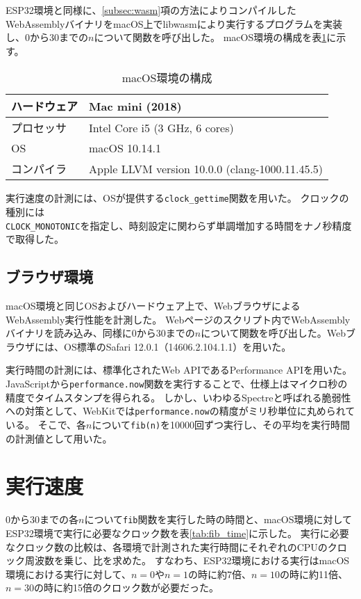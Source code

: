 ESP32環境と同様に、\ref{subsec:wasm}項の方法によりコンパイルしたWebAssemblyバイナリをmacOS上でlibwasmにより実行するプログラムを実装し、0から30までの$n$について関数を呼び出した。
macOS環境の構成を表\ref{tab:mac_spec}に示す。

\begin{table}[htbp]
  \label{tab:mac_spec}
  \caption{macOS環境の構成}
  \begin{center}
    \begin{tabular}{|l|l|}
    \hline
    ハードウェア & Mac mini (2018) \\ \hline
    プロセッサ & Intel Core i5 (3 GHz, 6 cores) \\ \hline
    OS & macOS 10.14.1 \\ \hline
    コンパイラ & Apple LLVM version 10.0.0 (clang-1000.11.45.5) \\ \hline
    \end{tabular}
  \end{center}
\end{table}

実行速度の計測には、OSが提供する\verb|clock_gettime|関数を用いた。
クロックの種別には \\
\verb|CLOCK_MONOTONIC|を指定し、時刻設定に関わらず単調増加する時間をナノ秒精度で取得した。

\subsection{ブラウザ環境}

macOS環境と同じOSおよびハードウェア上で、WebブラウザによるWebAssembly実行性能を計測した。
Webページのスクリプト内でWebAssemblyバイナリを読み込み、同様に0から30までの$n$について関数を呼び出した。Webブラウザには、OS標準のSafari 12.0.1（14606.2.104.1.1）を用いた。

実行時間の計測には、標準化されたWeb APIであるPerformance APIを用いた。
JavaScriptから\verb|performance.now|関数を実行することで、仕様上はマイクロ秒の精度でタイムスタンプを得られる。
しかし、いわゆるSpectreと呼ばれる脆弱性への対策として、WebKitでは\verb|performance.now|の精度がミリ秒単位に丸められている\cite{webkit_spectre}\cite{webkit_trac}。
そこで、各$n$について\verb|fib(n)|を10000回ずつ実行し、その平均を実行時間の計測値として用いた。

\section{実行速度}

0から30までの各$n$について\verb|fib|関数を実行した時の時間と、macOS環境に対してESP32環境で実行に必要なクロック数を表\ref{tab:fib_time}に示した。
実行に必要なクロック数の比較は、各環境で計測された実行時間にそれぞれのCPUのクロック周波数を乗じ、比を求めた。
すなわち、ESP32環境における実行はmacOS環境における実行に対して、$n=0$や$n=1$の時に約7倍、$n=10$の時に約11倍、$n=30$の時に約15倍のクロック数が必要だった。

